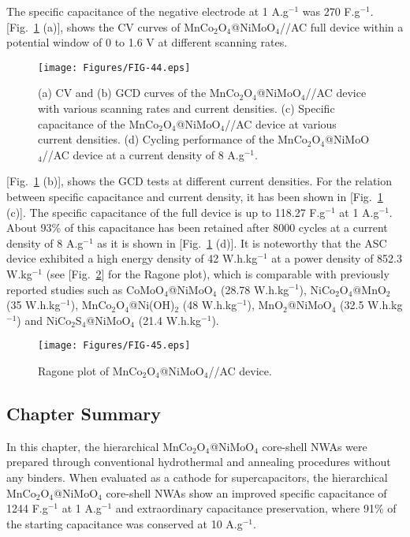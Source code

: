 \documentclass[reprint,amsmath,amssymb,aps,floatfix,
]{revtex4-2}
\begin{document}
The specific capacitance of the negative electrode at 1 A.g$^{-1}$ was 270 F.g$^{-1}$. [Fig.~\ref{fig:fig44} (a)], shows the CV curves of MnCo$_2$O$_4$@NiMoO$_4$//AC full device within a potential window of 0 to 1.6 V at different scanning rates. 
\begin{figure}[t]
    \centering
    \texttt{[image: Figures/FIG-44.eps]}
    \caption{\label{fig:fig44}(a) CV and (b) GCD curves of the MnCo$_2$O$_4$@NiMoO$_4$//AC device with various scanning rates and current densities. (c) Specific capacitance of the MnCo$_2$O$_4$@NiMoO$_4$//AC device at various current densities. (d) Cycling performance of the MnCo$_2$O$_4$@NiMoO$_4$//AC device at a current density of 8 A.g$^{-1}$.}
    \end{figure}
[Fig.~\ref{fig:fig44} (b)], shows the GCD tests at different current densities. For the relation between specific capacitance and current density, it has been shown in [Fig.~\ref{fig:fig44} (c)]. The specific capacitance of the full device is up to 118.27 F.g$^{-1}$ at 1 A.g$^{-1}$. About 93\% of this capacitance has been retained after 8000 cycles at a current density of 8 A.g$^{-1}$ as it is shown in [Fig.~\ref{fig:fig44} (d)]. It is noteworthy that the ASC device exhibited a high energy density of 42 W.h.kg$^{-1}$ at a power density of 852.3 W.kg$^{-1}$ (see [Fig.~\ref{fig:fig45}] for the Ragone plot), which is comparable with previously reported studies such as CoMoO$_4$@NiMoO$_4$ (28.78 W.h.kg$^{-1}$),\cite{Ziqing2016} NiCo$_2$O$_4$@MnO$_2$ (35 W.h.kg$^{-1}$),\cite{Kaibing2014} MnCo$_2$O$_4$@Ni(OH)$_2$ (48 W.h.kg$^{-1}$),\cite{Yan2016} MnO$_2$@NiMoO$_4$ (32.5 W.h.kg$^{-1}$)\cite{Xiuhua2016} and NiCo$_2$S$_4$@NiMoO$_4$ (21.4 W.h.kg$^{-1}$).\cite{Zhang2017}
\begin{figure}[b]
    \centering
    \texttt{[image: Figures/FIG-45.eps]}
    \caption{\label{fig:fig45}Ragone plot of MnCo$_2$O$_4$@NiMoO$_4$//AC device.}
    \end{figure}
\subsection{\label{sec:level3}Chapter Summary}
In this chapter, the hierarchical MnCo$_2$O$_4$@NiMoO$_4$ core-shell NWAs were prepared through conventional hydrothermal and annealing procedures without any binders. When evaluated as a cathode for supercapacitors, the hierarchical MnCo$_2$O$_4$@NiMoO$_4$ core-shell NWAs show an improved specific capacitance of 1244 F.g$^{-1}$ at 1 A.g$^{-1}$ and extraordinary capacitance preservation, where 91\% of the starting capacitance was conserved at 10 A.g$^{-1}$.
\end{document}
